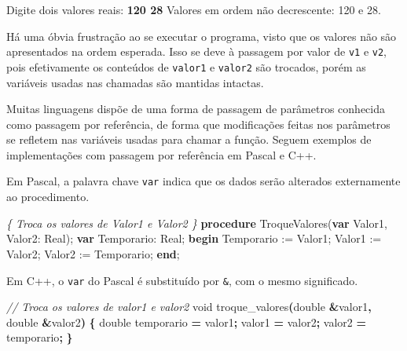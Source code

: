 \documentclass[
  11pt,
  a4paper,
]{scrbook}
\newenvironment{Shaded}{\begin{snugshade}}{\end{snugshade}}
\newcommand{\CommentTok}[1]{\textcolor[rgb]{0.56,0.35,0.01}{\textit{#1}}}
\newcommand{\DataTypeTok}[1]{\textcolor[rgb]{0.13,0.29,0.53}{#1}}
\newcommand{\KeywordTok}[1]{\textcolor[rgb]{0.13,0.29,0.53}{\textbf{#1}}}
\newcommand{\NormalTok}[1]{#1}
\newcommand{\OperatorTok}[1]{\textcolor[rgb]{0.81,0.36,0.00}{\textbf{#1}}}
\begin{document}
\begin{Shaded}
\begin{Highlighting}[]
\NormalTok{Digite dois valores reais: }\KeywordTok{ 120 28 }
\NormalTok{Valores em ordem não decrescente: 120 e 28.}
\end{Highlighting}
\end{Shaded}

Há uma óbvia frustração ao se executar o programa, visto que os valores
não são apresentados na ordem esperada. Isso se deve à passagem por
valor de \texttt{v1} e \texttt{v2}, pois efetivamente os conteúdos de
\texttt{valor1} e \texttt{valor2} são trocados, porém as variáveis
usadas nas chamadas são mantidas intactas.

Muitas linguagens dispõe de uma forma de passagem de parâmetros
conhecida como passagem por referência, de forma que modificações feitas
nos parâmetros se refletem nas variáveis usadas para chamar a função.
Seguem exemplos de implementações com passagem por referência em Pascal
e C++.

Em Pascal, a palavra chave \texttt{var} indica que os dados serão
alterados externamente ao procedimento.

\begin{Shaded}
\begin{Highlighting}[]
\CommentTok{\{ Troca os valores de Valor1 e Valor2 \}}
\KeywordTok{procedure}\NormalTok{ TroqueValores(}\KeywordTok{var}\NormalTok{ Valor1, Valor2: }\DataTypeTok{Real}\NormalTok{);}
\KeywordTok{var}\NormalTok{ Temporario: }\DataTypeTok{Real}\NormalTok{;}
\KeywordTok{begin}
\NormalTok{    Temporario := Valor1;}
\NormalTok{    Valor1 := Valor2;}
\NormalTok{    Valor2 := Temporario;}
\KeywordTok{end}\NormalTok{;}
\end{Highlighting}
\end{Shaded}

Em C++, o \texttt{var} do Pascal é substituído por \texttt{\&}, com o
mesmo significado.

\begin{Shaded}
\begin{Highlighting}[]
\CommentTok{// Troca os valores de valor1 e valor2}
\DataTypeTok{void}\NormalTok{ troque\_valores}\OperatorTok{(}\DataTypeTok{double} \OperatorTok{\&}\NormalTok{valor1}\OperatorTok{,} \DataTypeTok{double} \OperatorTok{\&}\NormalTok{valor2}\OperatorTok{)} \OperatorTok{\{}
    \DataTypeTok{double}\NormalTok{ temporario }\OperatorTok{=}\NormalTok{ valor1}\OperatorTok{;}
\NormalTok{    valor1 }\OperatorTok{=}\NormalTok{ valor2}\OperatorTok{;}
\NormalTok{    valor2 }\OperatorTok{=}\NormalTok{ temporario}\OperatorTok{;}
\OperatorTok{\}}
\end{Highlighting}
\end{Shaded}
\end{document}
